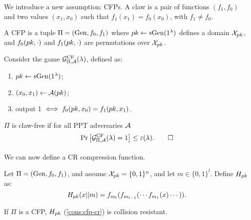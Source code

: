 We introduce a new assumption: \acp{CFP}.
A claw is a pair of functions $(f_1, f_0)$ and two values $(x_1,x_0)$ such that $f_1(x_1) = f_0(x_0)$, with $f_1 \neq f_0$.

\begin{definition}
	A \ac{CFP} is a tuple $\Pi = (\mathrm{Gen}, f_0, f_1)$ where $pk \leftarrow {\scriptstyle \$} {\mathrm{Gen}(1^{\lambda})}$ defines a domain $\mathcal{X}_{pk}$, and $f_0(pk, \cdot)$ and $f_1(pk, \cdot)$ are permutations over $\mathcal{X}_{pk}$.

	Consider the game $\mathcal{G}^{\scriptstyle \text{CF}}_{\Pi, \mathcal{A}}(\lambda)$, defined as:
	\begin{enumerate}
		\item $pk \leftarrow {\scriptstyle \$} {\mathrm{Gen}(1^{\lambda})}$;
		\item $(x_0, x_1) \leftarrow \mathcal{A}(pk)$;
		\item output 1 $\iff f_0(pk, x_0) = f_1(pk, x_1)$.
	\end{enumerate}
	$\Pi$ is claw-free if for all \ac{PPT} adversaries $\mathcal{A}$
	\begin{equation*}
		\mathop{\mathrm{Pr}}\limits_{} \left[ {\mathcal{G}^{\scriptstyle \text{CF}}_{\Pi, \mathcal{A}}(\lambda) = 1} \right] \le \varepsilon(\lambda). \qedhere
	\end{equation*}
\end{definition}

We can now define a \ac{CR} compression function.

\begin{construction} \label{cons:cfp-cr}
	Let $\Pi = (\mathrm{Gen}, f_0, f_1)$, and assume $\mathcal{X}_{pk} = \{0,1\}^{n}$, and let $m \in \{0,1\}^l$.
	Define $H_{pk}$ as:
	\begin{equation*}
		H_{pk} (x || m) = f_{m_l}( f_{m_{l-1}}( \cdots f_{m_1}(x) \cdots )).
	\end{equation*}
\end{construction}

\begin{theorem} \label{thm:cons-cfp-cr}
	If $\Pi$ is a \ac{CFP}, $H_{pk}$ (\cref{cons:cfp-cr}) is collision resistant.
\end{theorem}

